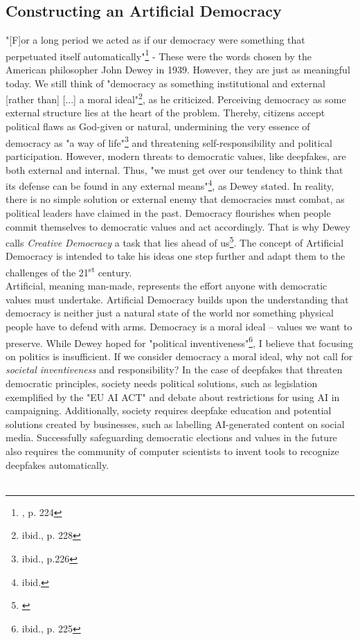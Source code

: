 \documentclass[wide]{adonis}
\begin{document}


        \subsection{Constructing an Artificial Democracy} 
       "[F]or a long period we acted as if our democracy were something that perpetuated itself automatically"\footnote{\cite{dewey1939}, p. 224 } - These were the words chosen by the American philosopher John Dewey in 1939. However, they are just as meaningful today. We still think of "democracy as something institutional and external [rather than] [...] a moral ideal"\footnote{ibid., p. 228}, as he criticized. Perceiving democracy as some external structure lies at the heart of the problem. Thereby, citizens accept political flaws as God-given or natural, undermining the very essence of democracy as "a way of life"\footnote{ibid., p.226} and threatening self-responsibility and political participation. 
       However, modern threats to democratic values, like deepfakes, are both external and internal. Thus, "we must get over our tendency to think that its defense can be found in any external means"\footnote{ibid.}, as Dewey stated. In reality, there is no simple solution or external enemy that democracies must combat, as political leaders have claimed in the past. Democracy flourishes when people commit themselves to democratic values and act accordingly. That is why Dewey calls \textit{Creative Democracy} a task that lies ahead of us\footnote{\cite{dewey1939}}. The concept of Artificial Democracy is intended to take his ideas one step further and adapt them to the challenges of the 21\textsuperscript{st} century.\\ Artificial, meaning man-made, represents the effort anyone with democratic values must undertake. Artificial Democracy builds upon the understanding that democracy is neither just a natural state of the world nor something physical people have to defend with arms. Democracy is a moral ideal -- values we want to preserve. While Dewey hoped for "political inventiveness"\footnote{ibid., p. 225}, I believe that focusing on politics is insufficient. If we consider democracy a moral ideal, why not call for \textit{societal inventiveness} and responsibility? In the case of deepfakes that threaten democratic principles, society needs political solutions, such as legislation exemplified by the "EU AI ACT" and debate about restrictions for using AI in campaigning. Additionally, society requires deepfake education and potential solutions created by businesses, such as labelling AI-generated content on social media. Successfully safeguarding democratic elections and values in the future also requires the community of computer scientists to invent tools to recognize deepfakes automatically.\\\\
\end{document}
